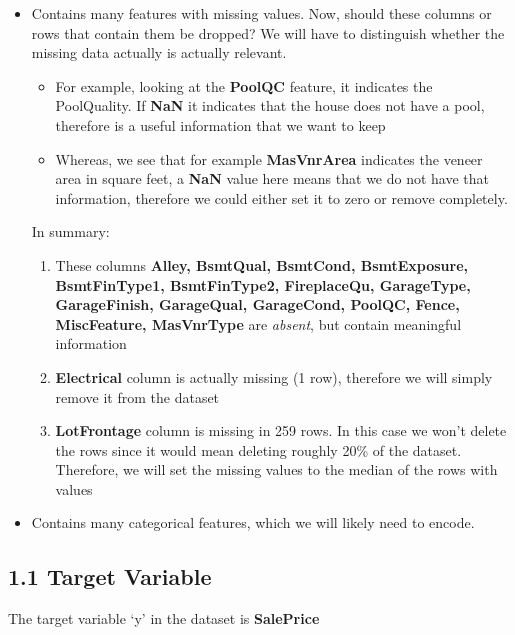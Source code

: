 \documentclass[11pt]{article}
\providecommand{\tightlist}{%
      \setlength{\itemsep}{0pt}\setlength{\parskip}{0pt}}
\begin{document}
\begin{itemize}
\tightlist
\item
  Contains many features with missing values. Now, should these columns
  or rows that contain them be dropped? We will have to distinguish
  whether the missing data actually is actually relevant.

  \begin{itemize}
  \tightlist
  \item
    For example, looking at the \textbf{PoolQC} feature, it indicates
    the PoolQuality. If \textbf{NaN} it indicates that the house does
    not have a pool, therefore is a useful information that we want to
    keep
  \item
    Whereas, we see that for example \textbf{MasVnrArea} indicates the
    veneer area in square feet, a \textbf{NaN} value here means that we
    do not have that information, therefore we could either set it to
    zero or remove completely.
  \end{itemize}

  In summary:

  \begin{enumerate}
  \def\labelenumi{\arabic{enumi}.}
  \tightlist
  \item
    These columns \textbf{Alley, BsmtQual, BsmtCond, BsmtExposure,
    BsmtFinType1, BsmtFinType2, FireplaceQu, GarageType, GarageFinish,
    GarageQual, GarageCond, PoolQC, Fence, MiscFeature, MasVnrType} are
    \emph{absent}, but contain meaningful information
  \item
    \textbf{Electrical} column is actually missing (1 row), therefore we
    will simply remove it from the dataset
  \item
    \textbf{LotFrontage} column is missing in 259 rows. In this case we
    won't delete the rows since it would mean deleting roughly 20\% of
    the dataset. Therefore, we will set the missing values to the median
    of the rows with values
  \end{enumerate}
\item
  Contains many categorical features, which we will likely need to
  encode.
\end{itemize}

    \subsection{1.1 Target Variable}\label{target-variable}

    The target variable `y' in the dataset is \textbf{SalePrice}
\end{document}
